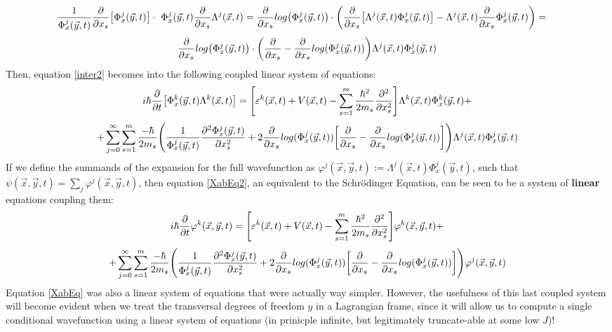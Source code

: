 \documentclass[11pt, a4paper]{article} %
\begin{document}
\begin{equation}
\hspace*{-0.4cm} \frac{1}{\Phi^j_x(\vec{y},t)}\pdv{}{x_s}\qty[\Phi^j_x(\vec{y},t)]\cdot\ \Phi^j_x(\vec{y},t)\pdv{}{x_s}\Lambda^j(\vec{x},t)=\pdv{}{x_s}log\qty(\Phi^j_x(\vec{y},t))\cdot \qty(\pdv{}{x_s}\qty[\Lambda^j(\vec{x},t)\Phi^j_x(\vec{y},t)]-\Lambda^j(\vec{x},t)\pdv{}{x_s}\Phi^j_x(\vec{y},t) )=
\end{equation}\vspace{-0.4cm}
$$
\pdv{}{x_s}log\qty(\Phi^j_x(\vec{y},t))\cdot \qty(\pdv{}{x_s}-\pdv{}{x_s}log(\Phi^j_x(\vec{y},t)) )\Lambda^j(\vec{x},t)\Phi^j_x(\vec{y},t)
$$
Then, equation \eqref{inter2} becomes into the following coupled linear system of equations:
\begin{equation}\label{XabEq2}
 i\hbar\pdv{}{t}\qty[ \Phi^k_x(\vec{y},t)\Lambda^k(\vec{x},t)]=\qty[ \varepsilon^k(\vec{x},t)+V(\vec{x},t)  -\sum_{s=1}^m\frac{\hbar^2}{2m_s}\pdv[2]{}{x_s} ]\Lambda^k(\vec{x},t)\Phi^k_x(\vec{y},t)+
\end{equation}
$$
+\sum_{j=0}^\infty\sum_{s=1}^m \frac{-\hbar}{2m_s}\qty( \frac{1}{\Phi^j_x(\vec{y},t)}\pdv[2]{\Phi^j_x(\vec{y},t)}{x_s}+2\pdv{}{x_s}log(\Phi^j_x(\vec{y},t))\qty[\pdv{}{x_s}-\pdv{}{x_s}log(\Phi^j_x(\vec{y},t))] )\Lambda^j(\vec{x},t)\Phi^j_x(\vec{y},t)
$$
If we define the summands of the expansion for the full wavefunction as $\varphi^j(\vec{x},\vec{y},t):=\Lambda^j(\vec{x},t)\Phi^j_x(\vec{y},t)$, such that $\psi(\vec{x},\vec{y},t)=\sum_j \varphi^j(\vec{x},\vec{y},t)$, then equation \eqref{XabEq2}, an equivalent to the Schrödinger Equation, can be seen to be a system of {\bf linear} equations coupling them:
\begin{equation}\label{XabEq2.5}
 i\hbar\pdv{}{t}\varphi^k(\vec{x},\vec{y},t)=\qty[ \varepsilon^k(\vec{x},t)+V(\vec{x},t)  -\sum_{s=1}^m\frac{\hbar^2}{2m_s}\pdv[2]{}{x_s} ]\varphi^k(\vec{x},\vec{y},t)+
\end{equation}
$$
+\sum_{j=0}^\infty\sum_{s=1}^m \frac{-\hbar}{2m_s}\qty( \frac{1}{\Phi^j_x(\vec{y},t)}\pdv[2]{\Phi^j_x(\vec{y},t)}{x_s}+2\pdv{}{x_s}log(\Phi^j_x(\vec{y},t))\qty[\pdv{}{x_s}-\pdv{}{x_s}log(\Phi^j_x(\vec{y},t))] )\varphi^j(\vec{x},\vec{y},t)
$$
Equation \eqref{XabEq} was also a linear system of equations that were actually way simpler. However, the usefulness of this last coupled system will become evident when we treat the transversal degrees of freedom $y$ in a Lagrangian frame, since it will allow us to compute a single conditional wavefunction using a linear system of equations (in prinicple infinite, but legitimately truncate-able at some low $J$)!\vspace{-0.3cm}
\end{document}
